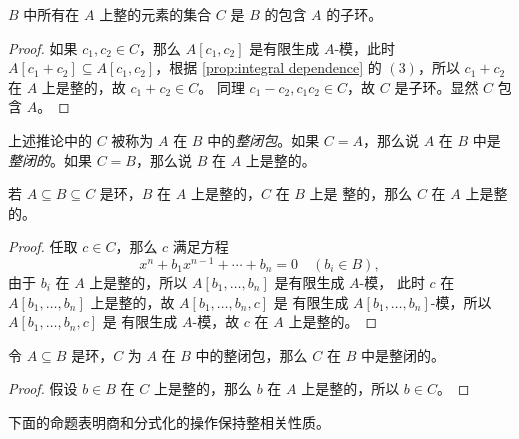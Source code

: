 \begin{corollary}
  $B$ 中所有在 $A$ 上整的元素的集合 $C$ 是 $B$ 的包含 $A$ 的子环。
\end{corollary}
\begin{proof}
  如果 $c_1,c_2\in C$，那么 $A[c_1,c_2]$ 是有限生成 $A$-模，此时
  $A[c_1+c_2]\subseteq A[c_1,c_2]$，根据 \autoref{prop:integral dependence}
  的 $(3)$，所以 $c_1+c_2$ 在 $A$ 上是整的，故 $c_1+c_2\in C$。
  同理 $c_1-c_2,c_1c_2\in C$，故 $C$ 是子环。显然 $C$ 包含 $A$。
\end{proof}

上述推论中的 $C$ 被称为 $A$ 在 $B$ 中的\emph{整闭包}。如果 $C=A$，那么说
$A$ 在 $B$ 中是\emph{整闭的}。如果 $C=B$，那么说 $B$ 在 $A$ 上是整的。

\begin{corollary}
  若 $A\subseteq B\subseteq C$ 是环，$B$ 在 $A$ 上是整的，$C$ 在 $B$ 上是
  整的，那么 $C$ 在 $A$ 上是整的。
\end{corollary}
\begin{proof}
  任取 $c\in C$，那么 $c$ 满足方程
  \[
    x^n+b_1x^{n-1}+\cdots+b_n=0\quad (b_i\in B),  
  \]
  由于 $b_i$ 在 $A$ 上是整的，所以 $A[b_1,\dots,b_n]$ 是有限生成 $A$-模，
  此时 $c$ 在 $A[b_1,\dots,b_n]$ 上是整的，故 $A[b_1,\dots,b_n,c]$ 是
  有限生成 $A[b_1,\dots,b_n]$-模，所以 $A[b_1,\dots,b_n,c]$ 是
  有限生成 $A$-模，故 $c$ 在 $A$ 上是整的。
\end{proof}

\begin{corollary}
  令 $A\subseteq B$ 是环，$C$ 为 $A$ 在 $B$ 中的整闭包，那么 $C$ 在 
  $B$ 中是整闭的。
\end{corollary}
\begin{proof}
  假设 $b\in B$ 在 $C$ 上是整的，那么 $b$ 在 $A$ 上是整的，所以 $b\in C$。
\end{proof}

下面的命题表明商和分式化的操作保持整相关性质。

